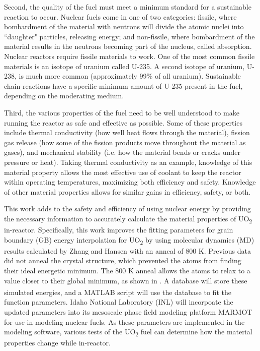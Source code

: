 \documentclass[twoside,senior]{BYUPhys}
\begin{document}
Second, the quality of the fuel must meet a minimum standard for a sustainable reaction to occur.  Nuclear fuels come in one of two categories: fissile, where bombardment of the material with neutrons will divide the atomic nuclei into ``daughter" particles, releasing energy; and non-fissile, where bombardment of the material results in the neutrons becoming part of the nucleus, called absorption.  Nuclear reactors require fissile materials to work.  One of the most common fissile materials is an isotope of uranium called U-235.  A second isotope of uranium, U-238, is much more common (approximately 99\% of all uranium).  Sustainable chain-reactions have a specific minimum amount of U-235 present in the fuel, depending on the moderating medium.\cite{uraniumInfo}

Third, the various properties of the fuel need to be well understood to make running the reactor as safe and effective as possible.  Some of these properties include thermal conductivity (how well heat flows through the material), fission gas release (how some of the fission products move throughout the material as gases), and mechanical stability (i.e. how the material bends or cracks under pressure or heat).  Taking thermal conductivity as an example, knowledge of this material property allows the most effective use of coolant to keep the reactor within operating temperatures, maximizing both efficiency and safety.  Knowledge of other material properties allows for similar gains in efficiency, safety, or both.


This work adds to the safety and efficiency of using nuclear energy by providing the necessary information to accurately calculate the material properties of UO\textsubscript{2} in-reactor.  Specifically, this work improves the fitting parameters for grain boundary (GB) energy interpolation for UO\textsubscript{2} by using molecular dynamics (MD) results calculated by Zhang\cite{zhang2016} and Hansen\cite{hansen2016} with an anneal of 800 K.  Previous data did not anneal the crystal structure\cite{harbison2015}, which prevented the atoms from finding their ideal energetic minimum.  The 800 K anneal allows the atoms to relax to a value closer to their global minimum, as shown in .  A database will store these simulated energies, and a MATLAB\textsuperscript{\textregistered} script will use the database to fit the function parameters.  Idaho National Laboratory (INL) will incorpoate the updated parameters into its mesoscale phase field modeling platform MARMOT for use in modeling nuclear fuels.  As these parameters are implemented in the modeling software, various tests of the UO\textsubscript{2} fuel can determine how the material properties change while in-reactor.
\end{document}
